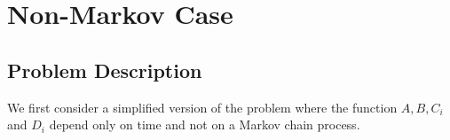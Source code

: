 \section{Non-Markov Case}


\subsection{Problem Description}
We first consider a simplified version of the problem where the function $A, B, C_i$ and $D_i$ depend only on time and not on a Markov chain process.\\

